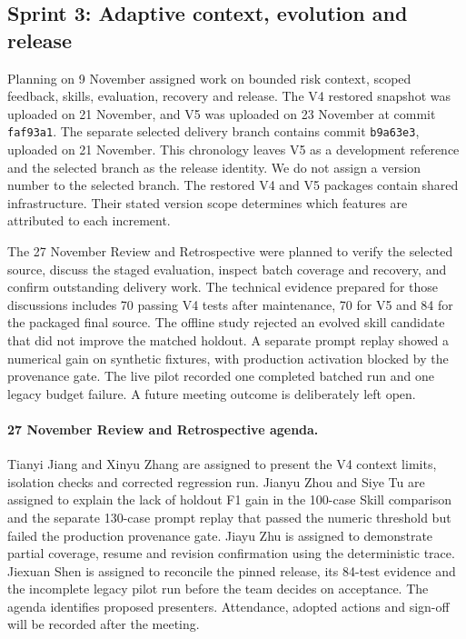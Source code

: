 \documentclass[journal,compsoc]{IEEEtran}
\begin{document}
\subsection{Sprint 3: Adaptive context, evolution and release}
Planning on 9 November assigned work on bounded risk context, scoped feedback, skills, evaluation, recovery and release. The V4 restored snapshot was uploaded on 21 November, and V5 was uploaded on 23 November at commit \texttt{faf93a1}. The separate selected delivery branch contains commit \texttt{b9a63e3}, uploaded on 21 November. This chronology leaves V5 as a development reference and the selected branch as the release identity. We do not assign a version number to the selected branch. The restored V4 and V5 packages contain shared infrastructure. Their stated version scope determines which features are attributed to each increment.

The 27 November Review and Retrospective were planned to verify the selected source, discuss the staged evaluation, inspect batch coverage and recovery, and confirm outstanding delivery work. The technical evidence prepared for those discussions includes 70 passing V4 tests after maintenance, 70 for V5 and 84 for the packaged final source. The offline study rejected an evolved skill candidate that did not improve the matched holdout. A separate prompt replay showed a numerical gain on synthetic fixtures, with production activation blocked by the provenance gate. The live pilot recorded one completed batched run and one legacy budget failure. A future meeting outcome is deliberately left open.

\paragraph{27 November Review and Retrospective agenda.}
Tianyi Jiang and Xinyu Zhang are assigned to present the V4 context limits, isolation checks and corrected regression run. Jianyu Zhou and Siye Tu are assigned to explain the lack of holdout F1 gain in the 100-case Skill comparison and the separate 130-case prompt replay that passed the numeric threshold but failed the production provenance gate. Jiayu Zhu is assigned to demonstrate partial coverage, resume and revision confirmation using the deterministic trace. Jiexuan Shen is assigned to reconcile the pinned release, its 84-test evidence and the incomplete legacy pilot run before the team decides on acceptance. The agenda identifies proposed presenters. Attendance, adopted actions and sign-off will be recorded after the meeting.
\end{document}
